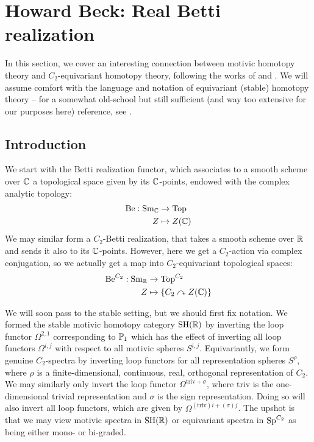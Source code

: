 \providecommand{\Be}{\mathrm{Be}}
\providecommand{\Loop}{\Omega}
\providecommand{\Smash}{\wedge}
\providecommand{\Sph}{\mathbb{S}}
\providecommand{\triv}{\mathrm{triv}}
\providecommand{\isom}{\simeq}
\providecommand{\GeomFix}{\Phi}

\providecommand{\SHRcell}{\SH_{\mathrm{cell}} (\R)}
\providecommand{\SpCt}{\Sp^{C_2}}
\providecommand{\BeCt}{\Be^{C_2}}
\providecommand{\pcomp}{_p^{\wedge}}
\providecommand{\pBeCt}{\widehat{\Be}_p^{C_2}}
\providecommand{\pSHRcell}{\SHRcell\pcomp}
\providecommand{\pSpCt}{(\SpCt)\pcomp}

\section{Howard Beck: Real Betti realization}
In this section, we cover an interesting connection between motivic homotopy theory and $ C_2 $-equivariant homotopy theory, following the works of \cite{Bachmann-betti} and \cite{BehrensShah-C2betti}.
We will assume comfort with the language and notation of equivariant (stable) homotopy theory -- for a somewhat old-school but still sufficient (and way too extensive for our purposes here) reference, see \cite{GreenleesMay}.

\subsection{Introduction}
We start with the Betti realization functor, which associates to a smooth scheme over $ \C $ a topological space given by its $ \C $-points, endowed with the complex analytic topology:
\begin{align*}
\Be: \Sm_\C &\to \Top \\
Z &\mapsto Z(\C)
\end{align*}
We may similar form a $ C_2 $-Betti realization, that takes a smooth scheme over $ \R $ and sends it also to its $ \C $-points.
However, here we get a $ C_2 $-action via complex conjugation, so we actually get a map into $ C_2 $-equivariant topological spaces:
\begin{align*}
\BeCt: \Sm_\R &\to \Top^{C_2} \\
Z &\mapsto \{C_2 \curvearrowright Z(\C) \}
\end{align*}

We will soon pass to the stable setting, but we should first fix notation.
We formed the stable motivic homotopy category $ \SH(\R) $ by inverting the loop functor $ \Loop^{2, 1} $ corresponding to $ \P_1 $ which has the effect of inverting all loop functors $ \Loop^{i, j} $ with respect to all motivic spheres $ S^{i, j} $.
Equivariantly, we form genuine $ C_2 $-spectra by inverting loop functors for all representation spheres $ S^\rho $, where $ \rho $ is a finite-dimensional, continuous, real, orthogonal representation of $ C_2 $.
We may similarly only invert the loop functor $ \Loop^{\triv + \sigma} $, where $ \triv $ is the one-dimensional trivial representation and $ \sigma $ is the sign representation.
Doing so will also invert all loop functors, which are given by $ \Loop^{(\triv)i + (\sigma)j} $.
The upshot is that we may view motivic spectra in $ \SH(\R) $ or equivariant spectra in $ \SpCt $ as being either mono- or bi-graded.
\\

